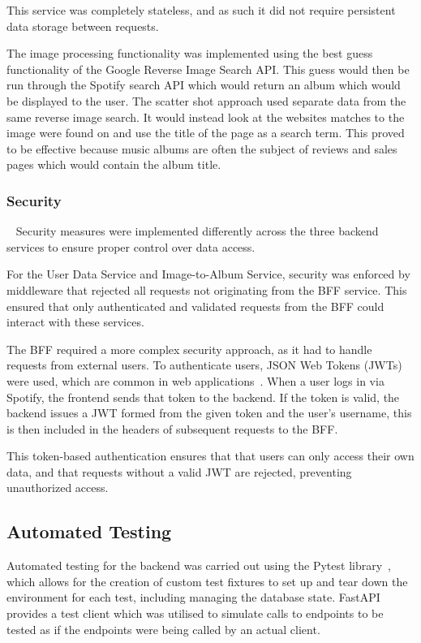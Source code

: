 This service was completely stateless, and as such it did not require persistent data storage between requests.

The image processing functionality was implemented using the best guess functionality of the Google Reverse Image Search API. This guess would then be run through the Spotify search API which would return an album which would be displayed to the user. The scatter shot approach used separate data from the same reverse image search. It would instead look at the websites matches to the image were found on and use the title of the page as a search term. This proved to be effective because music albums are often the subject of reviews and sales pages which would contain the album title.

\subsubsection{Security}~\label{sec:backend-security}
Security measures were implemented differently across the three backend services to ensure proper control over data access.

For the User Data Service and Image-to-Album Service, security was enforced by middleware that rejected all requests not originating from the BFF service. This ensured that only authenticated and validated requests from the BFF could interact with these services.

The BFF required a more complex security approach, as it had to handle requests from external users. To authenticate users, JSON Web Tokens (JWTs) were used, which are common in web applications~\cite{9320801}. When a user logs in via Spotify, the frontend sends that token to the backend. If the token is valid, the backend issues a JWT formed from the given token and the user's username, this is then included in the headers of subsequent requests to the BFF.

This token-based authentication ensures that that users can only access their own data, and that requests without a valid JWT are rejected, preventing unauthorized access.

\subsection{Automated Testing}
Automated testing for the backend was carried out using the Pytest library~\cite{PyTest}, which allows for the creation of custom test fixtures to set up and tear down the environment for each test, including managing the database state. FastAPI provides a test client which was utilised to simulate calls to endpoints to be tested as if the endpoints were being called by an actual client.

